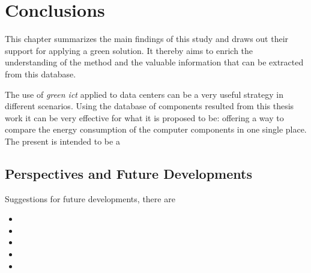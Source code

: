

\chapter{Conclusions} \label{conclusion}





    This chapter summarizes the main findings of this study and draws out their support for applying a green solution. It thereby aims to enrich the understanding of the method and the valuable information that can be extracted from this database. 
    
    The use of \emph{green ict} applied to data centers can be a very useful strategy in different scenarios. Using the database of components resulted from this thesis work it can be very effective for what it is proposed to be: offering a way to compare the energy consumption of the computer components in one single place. The present is intended to be a 
    

\section*{Perspectives and Future Developments}
Suggestions for future developments, there are

\begin{itemize}
	\item %
	\item %
	\item %
	\item %
	\item %
\end{itemize}
